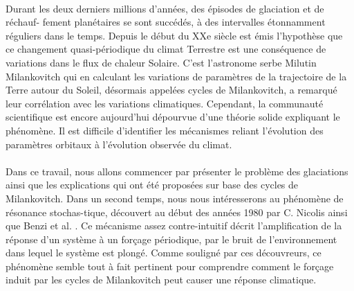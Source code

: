 
\paragraph{} Durant les deux derniers millions d'années, des épisodes de glaciation et de réchauf- fement planétaires se sont succédés, à des intervalles étonnamment réguliers dans le temps. Depuis le début du XXe siècle est émis l'hypothèse que ce changement quasi-périodique du climat Terrestre est une conséquence de variations dans le flux de chaleur Solaire. C'est l'astronome serbe Milutin Milankovitch qui en calculant les variations de paramètres de la trajectoire de la Terre autour du Soleil, désormais appelées cycles de Milankovitch, a remarqué leur corrélation avec les variations climatiques. Cependant, la communauté scientifique est encore aujourd'hui dépourvue d'une théorie solide expliquant le phénomène. Il est difficile d'identifier les mécanismes reliant l'évolution des paramètres orbitaux à l'évolution observée du climat. 

\paragraph{} Dans ce travail, nous allons commencer par présenter le problème des glaciations ainsi que les explications qui ont été proposées sur base des cycles de Milankovitch. Dans un second temps, nous nous intéresserons au phénomène de résonance stochas-tique, découvert au début des années 1980 par C. Nicolis \cite{nicolis1981} ainsi que Benzi et al. \cite{benzi1981}. Ce mécanisme assez contre-intuitif décrit l'amplification de la réponse d'un système à un forçage périodique, par le bruit de l'environnement dans lequel le système est plongé. Comme souligné par ces découvreurs, ce phénomène semble tout à fait pertinent pour comprendre comment le forçage induit par les cycles de Milankovitch peut causer une réponse climatique. 

